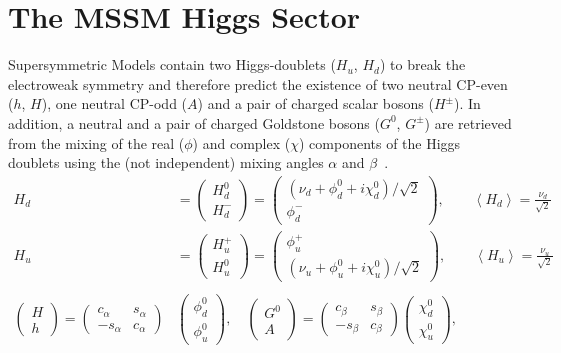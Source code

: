 \documentclass[11pt,a4paper]{article}
\begin{document}
\section{The MSSM Higgs Sector}
\label{sec:MSSMhiggs}
Supersymmetric Models contain two Higgs-doublets ($H_u$, $H_d$) to break the electroweak symmetry and therefore predict the existence of two neutral CP-even ($h$, $H$), one neutral CP-odd ($A$) and a pair of charged scalar bosons ($H^\pm$). In addition, a neutral and a pair of charged Goldstone bosons ($G^0$, $G^\pm$) are retrieved from the mixing of the real ($\phi$) and complex ($\chi$) components of the Higgs doublets using the (not independent) mixing angles $\alpha$ and $\beta$~\cite{Gunion:1989we, Djouadi:2005gj, Drees:873465}.
%
\begin{align}
H_d &= \begin{pmatrix}H_d^0\\H_d^-\end{pmatrix} = \begin{pmatrix}\left(\nu_d + \phi_d^0 + i\chi_d^0\right)/\sqrt{2}\\\phi_d^-\end{pmatrix},\qquad \left\langle H_d\right\rangle = \frac{\nu_d}{\sqrt{2}}\\
H_u &= \begin{pmatrix}H_u^+\\H_u^0\end{pmatrix} = \begin{pmatrix}\phi_u^+\\\left(\nu_u + \phi_u^0 + i\chi_u^0\right)/\sqrt{2}\end{pmatrix},\qquad \left\langle H_u\right\rangle = \frac{\nu_u}{\sqrt{2}}\\\nonumber\\
\begin{pmatrix}H\\ h\end{pmatrix} = \begin{pmatrix} c_\alpha & s_\alpha\\ -s_\alpha & c_\alpha\end{pmatrix} &\begin{pmatrix}\phi_d^0\\ \phi_u^0\end{pmatrix},\quad
\begin{pmatrix}G^0\\ A\end{pmatrix} = \begin{pmatrix} c_\beta & s_\beta\\ -s_\beta & c_\beta\end{pmatrix} \begin{pmatrix}\chi_d^0\\ \chi_u^0\end{pmatrix},\quad

\end{align}
\end{document}
